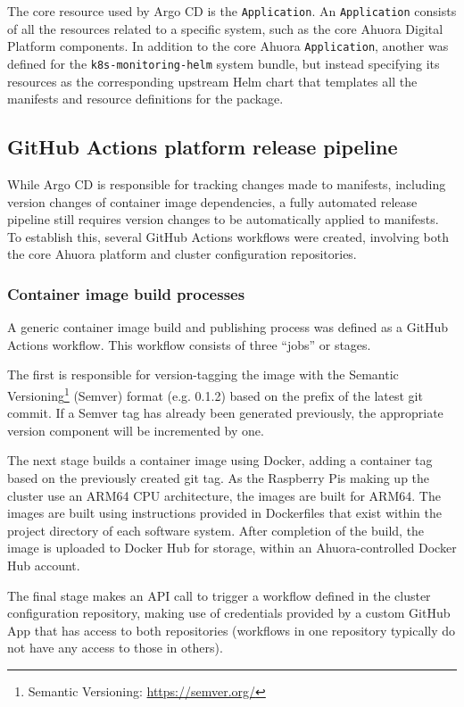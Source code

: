 The core resource used by Argo CD is the \verb|Application|. An \verb|Application| consists of all the resources related to a specific system, such as the core Ahuora Digital Platform components. In addition to the core Ahuora \verb|Application|, another was defined for the \verb|k8s-monitoring-helm| system bundle, but instead specifying its resources as the corresponding upstream Helm chart that templates all the manifests and resource definitions for the package.

\subsection{GitHub Actions platform release pipeline}

While Argo CD is responsible for tracking changes made to manifests, including version changes of container image dependencies, a fully automated release pipeline still requires version changes to be automatically applied to manifests. To establish this, several GitHub Actions workflows were created, involving both the core Ahuora platform and cluster configuration repositories.

\subsubsection{Container image build processes} \label{section:build-process}

A generic container image build and publishing process was defined as a GitHub Actions workflow. This workflow consists of three ``jobs'' or stages. 

The first is responsible for version-tagging the image with the Semantic Versioning\footnote{Semantic Versioning: \url{https://semver.org/}} (Semver) format (e.g. 0.1.2) based on the prefix of the latest git commit. If a Semver tag has already been generated previously, the appropriate version component will be incremented by one.

The next stage builds a container image using Docker, adding a container tag based on the previously created git tag. As the Raspberry Pis making up the cluster use an ARM64 CPU architecture, the images are built for ARM64. The images are built using instructions provided in Dockerfiles that exist within the project directory of each software system. After completion of the build, the image is uploaded to Docker Hub for storage, within an Ahuora-controlled Docker Hub account.

The final stage makes an API call to trigger a workflow defined in the cluster configuration repository, making use of credentials provided by a custom GitHub App that has access to both repositories (workflows in one repository typically do not have any access to those in others).

